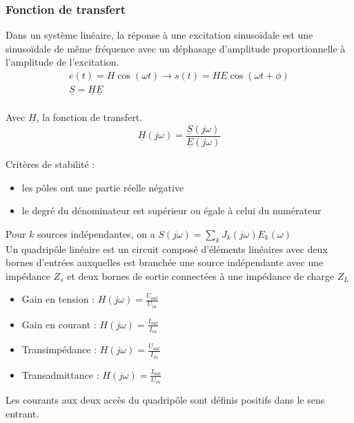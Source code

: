 \documentclass[../main.tex]{subfiles}
\begin{document}
\subsubsection{Fonction de transfert}
Dans un système linéaire, la réponse à une excitation sinusoïdale est une sinusoïdale de même fréquence avec un déphasage d'amplitude proportionnelle à l'amplitude de l'excitation.\\

\begin{equation}
    \begin{gathered}
        e(t) = H\cos(\omega t) \rightarrow s(t) = HE \cos(\omega t+\phi)\\
        \underline{S}= \underline{H} \underline{E}\\
    \end{gathered}
\end{equation}

Avec $\underline{H}$, la fonction de transfert.\\
\begin{equation}
    \underline{H}(j\omega) = \frac{\underline{S}(j\omega)}{\underline{E}(j\omega)}
\end{equation}

Critères de stabilité : \begin{itemize}
    \item les pôles ont une partie réelle négative\\
    \item le degré du dénominateur est supérieur ou égale à celui du numérateur\\
\end{itemize}

Pour $k$ sources indépendantes, on a $S(j\omega) = \sum_k J_k(j\omega) E_k(\omega)$\\

Un quadripôle linéaire est un circuit composé d'éléments linéaires avec deux bornes d'entrées auxquelles est branchée une source indépendante avec une impédance $Z_s$ et deux bornes de sortie connectées à une impédance de charge $Z_L$\\

\begin{itemize}
    \item Gain en tension : $H(j\omega) = \frac{U_{out}}{U_{in}}$\\
    \item Gain en courant : $H(j\omega) = \frac{I_{out}}{I_{in}}$\\
    \item Transimpédance : $H(j\omega) = \frac{U_{out}}{I_{in}}$\\
    \item Transadmittance : $H(j\omega)=\frac{I_{out}}{U_{in}}$\\
\end{itemize}
\warning Les courants aux deux accès du quadripôle sont définis positifs dans le sens entrant.\\
\end{document}
